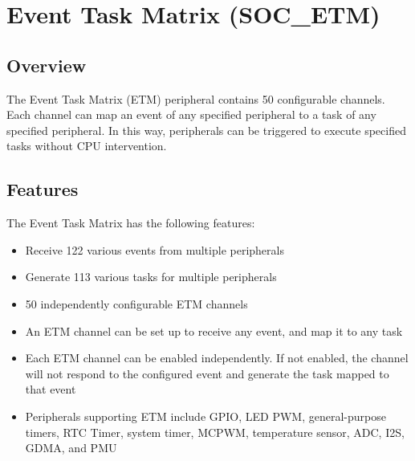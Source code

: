 \documentclass[main\_\_EN.tex]{subfiles}
\begin{document}

\ifglobal
\else
    {\let\clearpage\relax \listoftodos}
    {\let\clearpage\relax \listofdonetodos}
    \tableofcontents
\fi



\hypertarget{evntaskmatrix}{}
\chapter{Event Task Matrix (SOC\_ETM)}
\label{mod:evntaskmatrix}



\section{Overview}
The Event Task Matrix (ETM) peripheral contains 50 configurable channels. Each channel can map an event of any specified peripheral to a task of any specified peripheral. In this way, peripherals can be triggered to execute specified tasks without CPU intervention.



\section{Features}
\label{sec:evntaskmatrix-features}

The Event Task Matrix has the following features:
\begin{itemize}
    \item Receive 122 various events from multiple peripherals
    \item Generate 113 various tasks for multiple peripherals
    \item 50 independently configurable ETM channels
    \item An ETM channel can be set up to receive any event, and map it to any task
    \item Each ETM channel can be enabled independently. If not enabled, the channel will not respond to the configured event and generate the task mapped to that event
    \item Peripherals supporting ETM include GPIO, LED PWM, general-purpose timers, RTC Timer, system timer, MCPWM, temperature sensor, ADC, I2S, GDMA, and PMU
\end{itemize}
\end{document}
